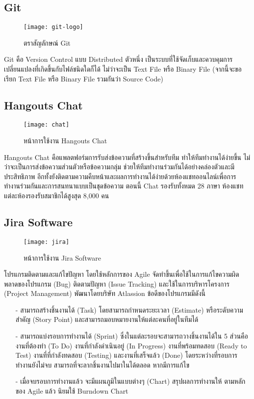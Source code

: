     \subsection{Git}
        \begin{figure}[H]
            \centering
            \texttt{[image: git-logo]}
            \caption{ตราสัญลักษณ์ Git}\label{git-logo}
        \end{figure}
        Git คือ Version Control แบบ Distributed ตัวหนึ่ง เป็นระบบที่ใช้จัดเก็บและควบคุมการเปลี่ยนแปลงที่เกิดขึ้นกับไฟล์ชนิดใดก็ได้ ไม่ว่าจะเป็น Text File หรือ Binary File (จากนี้จะขอเรียก Text File หรือ Binary File รวมกันว่า Source Code)

    \subsection{Hangouts Chat}
        \begin{figure}[H]
            \centering
            \texttt{[image: chat]}
            \caption{หน้าการใช้งาน Hangouts Chat}\label{chat}
        \end{figure}
        Hangouts Chat คือแพลตฟอร์มการรับส่งข้อความที่สร้างขึ้นสำหรับทีม ทำให้ทีมทำงานได้ง่ายขึ้น ไม่ว่าจะเป็นการส่งข้อความส่วนตัวหรือข้อความกลุ่ม ช่วยให้ทีมทำงานร่วมกันได้อย่างคล่องตัวและมีประสิทธิภาพ อีกทั้งยังติดตามความคืบหน้าและผลการทำงานได้ง่ายด้วยห้องแชทออนไลน์เพื่อการทำงานร่วมกันและการสนทนาแบบเป็นชุดข้อความ ตอนนี้ Chat รองรับทั้งหมด 28 ภาษา ห้องแชทแต่ละห้องรองรับสมาชิกได้สูงสุด 8,000 คน

    \subsection{Jira Software}
        \begin{figure}[H]
            \centering
            \texttt{[image: jira]}
            \caption{หน้าการใช้งาน Jira Software}\label{jira}
        \end{figure}
        โปรแกรมติดตามและแก้ไขปัญหา โดยใช้หลักการของ Agile จัดทำขึ้นเพื่อใช้ในการแก้ไขความผิดพลาดของโปรแกรม (Bug) ติดตามปัญหา (Issue Tracking) และใช้ในการบริหารโครงการ (Project Management) พัฒนาโดยบริษัท Atlassion ข้อดีของโปรแกรมมีดังนี้
        \begin{itemize}
            \item[-] สามารถสร้างชิ้นงานได้ (Task) โดยสามารถกำหนดระยะเวลา (Estimate) หรือระดับความสำคัญ (Story Point) และสามารถมอบหมายงานให้แต่ละคนที่อยู่ในทีมได้
            \item[-] สามารถแบ่งรอบการทำงานได้ (Sprint) ซึ่งในแต่ละรอบจะสามารถวางชิ้นงานได้ใน 5 ส่วนคือ งานที่ต้องทำ (To Do) งานที่กำลังดำเนินอยู่ (In Progress) งานที่พร้อมทดสอบ (Ready to Test) งานที่ที่กำลังทดสอบ (Testing) และงานที่เสร็จแล้ว (Done) โดยระหว่างที่รอบการทำงานยังไม่จบ สามารถที่จะลากชิ้นงานไปมาในได้ตลอด หากมีการแก้ไข
            \item[-] เมื่อจบรอบการทำงานแล้ว จะมีแผนภูมิในแบบต่างๆ (Chart) สรุปผลการทำงานให้ ตามหลักของ Agile แล้ว นิยมใช้ Burndown Chart
        \end{itemize}

